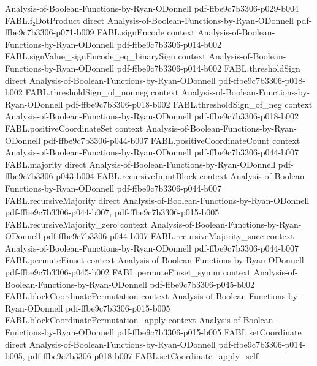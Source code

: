 \begin{theorem}
  {Analysis-of-Boolean-Functions-by-Ryan-ODonnell}
  {pdf-ffbe9c7b3306-p029-b004}
\proofstep
  {FABL.f₂DotProduct}
  {direct}
  {Analysis-of-Boolean-Functions-by-Ryan-ODonnell}
  {pdf-ffbe9c7b3306-p071-b009}
\proofstep
  {FABL.signEncode}
  {context}
  {Analysis-of-Boolean-Functions-by-Ryan-ODonnell}
  {pdf-ffbe9c7b3306-p014-b002}
\proofstep
  {FABL.signValue_signEncode_eq_binarySign}
  {context}
  {Analysis-of-Boolean-Functions-by-Ryan-ODonnell}
  {pdf-ffbe9c7b3306-p014-b002}
\proofstep
  {FABL.thresholdSign}
  {direct}
  {Analysis-of-Boolean-Functions-by-Ryan-ODonnell}
  {pdf-ffbe9c7b3306-p018-b002}
\proofstep
  {FABL.thresholdSign_of_nonneg}
  {context}
  {Analysis-of-Boolean-Functions-by-Ryan-ODonnell}
  {pdf-ffbe9c7b3306-p018-b002}
\proofstep
  {FABL.thresholdSign_of_neg}
  {context}
  {Analysis-of-Boolean-Functions-by-Ryan-ODonnell}
  {pdf-ffbe9c7b3306-p018-b002}
\proofstep
  {FABL.positiveCoordinateSet}
  {context}
  {Analysis-of-Boolean-Functions-by-Ryan-ODonnell}
  {pdf-ffbe9c7b3306-p044-b007}
\proofstep
  {FABL.positiveCoordinateCount}
  {context}
  {Analysis-of-Boolean-Functions-by-Ryan-ODonnell}
  {pdf-ffbe9c7b3306-p044-b007}
\proofstep
  {FABL.majority}
  {direct}
  {Analysis-of-Boolean-Functions-by-Ryan-ODonnell}
  {pdf-ffbe9c7b3306-p043-b004}
\proofstep
  {FABL.recursiveInputBlock}
  {context}
  {Analysis-of-Boolean-Functions-by-Ryan-ODonnell}
  {pdf-ffbe9c7b3306-p044-b007}
\proofstep
  {FABL.recursiveMajority}
  {direct}
  {Analysis-of-Boolean-Functions-by-Ryan-ODonnell}
  {pdf-ffbe9c7b3306-p044-b007,
    pdf-ffbe9c7b3306-p015-b005}
\proofstep
  {FABL.recursiveMajority_zero}
  {context}
  {Analysis-of-Boolean-Functions-by-Ryan-ODonnell}
  {pdf-ffbe9c7b3306-p044-b007}
\proofstep
  {FABL.recursiveMajority_succ}
  {context}
  {Analysis-of-Boolean-Functions-by-Ryan-ODonnell}
  {pdf-ffbe9c7b3306-p044-b007}
\proofstep
  {FABL.permuteFinset}
  {context}
  {Analysis-of-Boolean-Functions-by-Ryan-ODonnell}
  {pdf-ffbe9c7b3306-p045-b002}
\proofstep
  {FABL.permuteFinset_symm}
  {context}
  {Analysis-of-Boolean-Functions-by-Ryan-ODonnell}
  {pdf-ffbe9c7b3306-p045-b002}
\proofstep
  {FABL.blockCoordinatePermutation}
  {context}
  {Analysis-of-Boolean-Functions-by-Ryan-ODonnell}
  {pdf-ffbe9c7b3306-p015-b005}
\proofstep
  {FABL.blockCoordinatePermutation_apply}
  {context}
  {Analysis-of-Boolean-Functions-by-Ryan-ODonnell}
  {pdf-ffbe9c7b3306-p015-b005}
\proofstep
  {FABL.setCoordinate}
  {direct}
  {Analysis-of-Boolean-Functions-by-Ryan-ODonnell}
  {pdf-ffbe9c7b3306-p014-b005,
    pdf-ffbe9c7b3306-p018-b007}
\proofstep
  {FABL.setCoordinate_apply_self}

\end{theorem}
